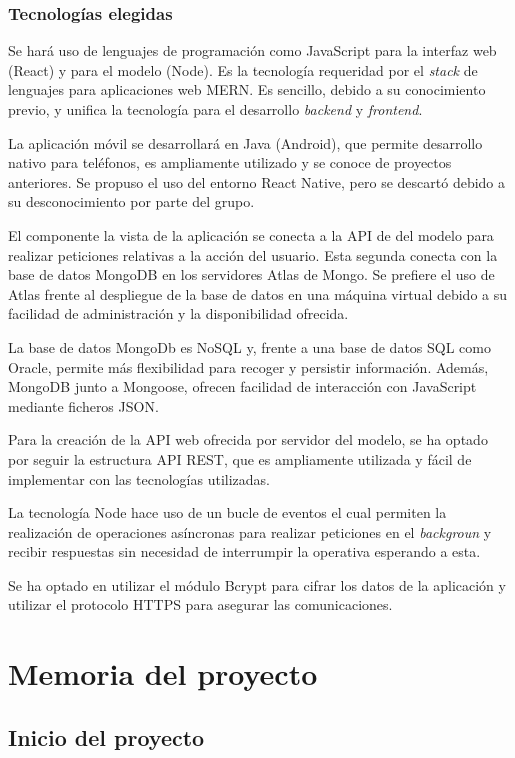 \documentclass{article}
\begin{document}
\subsubsection*{Tecnologías elegidas}

Se hará uso de lenguajes de programación como JavaScript para la interfaz web (React) y para el modelo (Node). Es la tecnología requeridad por el \textit{stack} de lenguajes para aplicaciones web MERN. Es sencillo, debido a su conocimiento previo, y unifica la tecnología para el desarrollo \textit{backend} y \textit{frontend}.

La aplicación móvil se desarrollará en Java (Android), que permite desarrollo nativo para teléfonos, es ampliamente utilizado y se conoce de proyectos anteriores. Se propuso el uso del entorno React Native, pero se descartó debido a su desconocimiento por parte del grupo.

El componente la vista de la aplicación se conecta a la API de del modelo para realizar peticiones relativas a la acción del usuario. Esta segunda conecta con la base de datos MongoDB en los servidores Atlas de Mongo. Se prefiere el uso de Atlas frente al despliegue de la base de datos en una máquina virtual debido a su facilidad de administración y la disponibilidad ofrecida. 

La base de datos MongoDb es NoSQL y, frente a una base de datos SQL como Oracle, permite más flexibilidad para recoger y persistir información. Además, MongoDB junto a Mongoose, ofrecen facilidad de interacción con JavaScript mediante ficheros JSON.

Para la creación de la API web ofrecida por servidor del modelo, se ha optado por seguir la estructura API REST, que es ampliamente utilizada y fácil de implementar con las tecnologías utilizadas. 

La tecnología Node hace uso de un bucle de eventos el cual permiten la realización de operaciones asíncronas para realizar peticiones en el \textit{backgroun} y recibir respuestas sin necesidad de interrumpir la operativa esperando a esta.

Se ha optado en utilizar el módulo Bcrypt para cifrar los datos de la aplicación y utilizar el protocolo HTTPS para asegurar las comunicaciones. 


\section{Memoria del proyecto}

\subsection{Inicio del proyecto}
\end{document}
